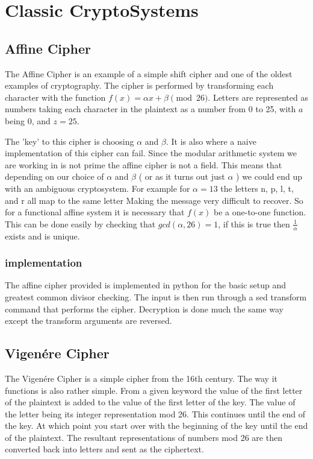 
\chapter{Classic CryptoSystems}

\section{Affine Cipher}

The Affine Cipher is an example of a simple shift cipher and one of the oldest examples of cryptography.
The cipher is performed by transforming each character with the function $f(x) = \alpha x + \beta \pmod{26}$.
Letters are represented as numbers taking each character in the plaintext as a number from 0 to 25, with $a$ being 0, and $z= 25$.

The 'key' to this cipher is choosing $\alpha$ and $\beta$. It is also where a naive implementation of this cipher can fail.
Since the modular arithmetic system we are working in is not prime the affine cipher is not a field. 
This means that depending on our choice of $\alpha$ and $\beta$ ( or as it turns out just $\alpha$ ) we could end up with an ambiguous cryptosystem.
For example for $\alpha = 13$ the letters n, p, l, t, and r all map to the same letter Making the message very difficult to recover.
So for a functional affine system it is necessary that $f(x)$ be a one-to-one function. 
This can be done easily by checking that $gcd(\alpha , 26) = 1$, if this is true then $\frac{1}{\alpha}$ exists and is unique.

\subsection{implementation}
The affine cipher provided is implemented in python for the basic setup and greatest common divisor checking.
The input is then run through a sed transform command that performs the cipher.
Decryption is done much the same way except the transform arguments are reversed.

\section{Vigen\'ere Cipher}

The Vigen\'ere Cipher is a simple cipher from the 16th century. 
The way it functions is also rather simple.
From a given keyword the value of the first letter of the plaintext is added to the value of the first letter of the key. 
The value of the letter being its integer representation mod 26.
This continues until the end of the key. At which point you start over with the beginning of the key until the end of the plaintext.
The resultant representations of numbers mod 26 are then converted back into letters and sent as the ciphertext.

